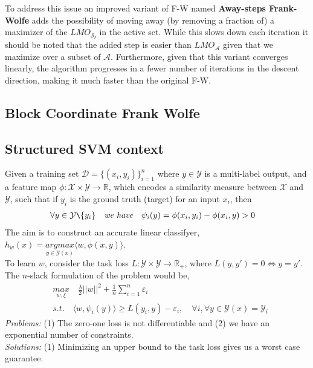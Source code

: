 To address this issue an improved variant of F-W named \textbf{Away-steps
Frank-Wolfe} adds the possibility of moving away (by removing a fraction of) a
maximizer of the $LMO_{\mathcal{S_{t}}}$ in the active set. While this slows
down each iteration it should be noted that the added step is easier than
$LMO_{\mathcal{A}}$ given that we maximize over a subset of $\mathcal{A}$.
Furthermore, given that this variant converges linearly, the algorithm
progresses in a fewer number of iterations in the descent direction, making it
much faster than the original F-W.
\subsection{Block Coordinate Frank Wolfe}
\subsection{Structured SVM context}
Given a training set $\mathcal{D}=\{(x_i,y_i)\}_{i=1}^n$ where $y \in
\mathcal{Y}$ is a multi-label output, and a feature map
$\phi:\mathcal{X}\times\mathcal{Y}\longrightarrow \mathbb{R}$, which encodes a
similarity measure between $\mathcal{X}$ and $\mathcal{Y}$, such that if $y_{i}$
is the ground truth (target) for an input $x_{i}$, then
\begin{equation*}
\begin{aligned}
    &\forall y\in\mathcal{Y}\texttt{\symbol{92}}\{y_{i}\}\quad\textit{we
have}\quad \psi_{i}(y) = \phi(x_{i},y_{i})- \phi(x_{i},y) > 0
\end{aligned}
\end{equation*}
The aim is to construct an accurate linear classifyer, $h_{w}(x)=
\underset{y\in\mathcal{Y}(x)}{\textit{argmax}}\langle w, \phi(x,y)\rangle$.\\ To
learn $w$, consider the task loss
$L:\mathcal{Y}\times\mathcal{Y}\longrightarrow\mathbb{R}_{+}$, where
$L(y,y\prime)= 0 \Longleftrightarrow y= y\prime$. \\

The $n$-slack formulation of the problem would be,
\begin{equation*}
\begin{aligned}
    &\underset{w,\xi}{\textit{max}}\quad\frac{\lambda}{2}||w||^{2}+ \frac{1}{n}\sum_{i=1}^{n}\varepsilon_{i}\\
    &\textit{s.t.}\quad \langle w, \psi_{i}(y)\rangle \geq L(y_{i},y)-
\varepsilon_{i},\quad\forall i ,\forall y\in\mathcal{Y}(x)=\mathcal{Y}_{i}
\end{aligned}
\end{equation*}
\textit{Problems:} (1) The zero-one loss is not differentiable and (2) we have
an exponential number of constraints.\\ \textit{Solutions:} (1) Minimizing an
upper bound to the task loss gives us a worst case guarantee.\\


